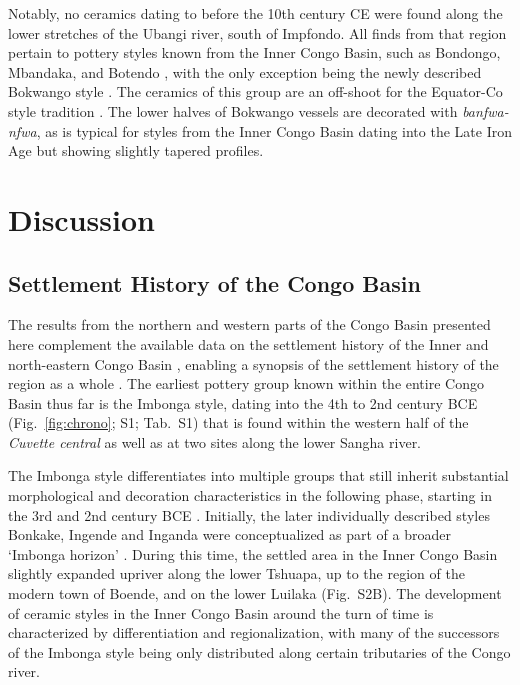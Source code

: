 \documentclass[smallextended,natbib]{svjour3}       %
\begin{document}
Notably, no ceramics dating to before the 10th century CE were found along the lower stretches of the Ubangi river, south of Impfondo. All finds from that region pertain to pottery styles known from the Inner Congo Basin, such as Bondongo, Mbandaka, and Botendo \citep[Fig.~\ref{fig:ubangi}.14--16,25;][172--181]{Seidensticker.2021e}, with the only exception being the newly described Bokwango style \citep[Fig.~\ref{fig:ubangi}.17--18;][96--99]{Seidensticker.2021e}. The ceramics of this group are an off-shoot for the Equator-Co style tradition \citep{Wotzka.1995}. The lower halves of Bokwango vessels are decorated with \textit{banfwa-nfwa}, as is typical for styles from the Inner Congo Basin dating into the Late Iron Age but showing slightly tapered profiles.

\section*{Discussion}

\subsection*{Settlement History of the Congo Basin}

The results from the northern and western parts of the Congo Basin presented here complement the available data on the settlement history of the Inner \citep{Wotzka.1995} and north-eastern Congo Basin \citep{LivingstoneSmith.2017}, enabling a synopsis of the settlement history of the region as a whole \citep[218--244]{Seidensticker.2021e}. The earliest pottery group known within the entire Congo Basin thus far is the Imbonga style, dating into the 4th to 2nd century BCE (Fig.~\ref{fig:chrono}; S1; Tab.~S1) that is found within the western half of the \textit{Cuvette central} \citep[Fig.~\ref{fig:timeslices_1_eia}A;][59--68]{Wotzka.1995} as well as at two sites along the lower Sangha river.

The Imbonga style differentiates into multiple groups that still inherit substantial morphological and decoration characteristics in the following phase, starting in the 3rd and 2nd century BCE \citep[219--224]{Seidensticker.2021e}. Initially, the later individually described styles Bonkake, Ingende and Inganda \citep[Fig.~\ref{fig:chrono}; S1; Tab.~S1;][68--84]{Wotzka.1995} were conceptualized as part of a broader ‘Imbonga horizon’ \citep{Eggert.1983}. During this time, the settled area in the Inner Congo Basin slightly expanded upriver along the lower Tshuapa, up to the region of the modern town of Boende, and on the lower Luilaka (Fig.~S2B). The development of ceramic styles in the Inner Congo Basin around the turn of time is characterized by differentiation and regionalization, with many of the successors of the Imbonga style being only distributed along certain tributaries of the Congo river.
\end{document}
